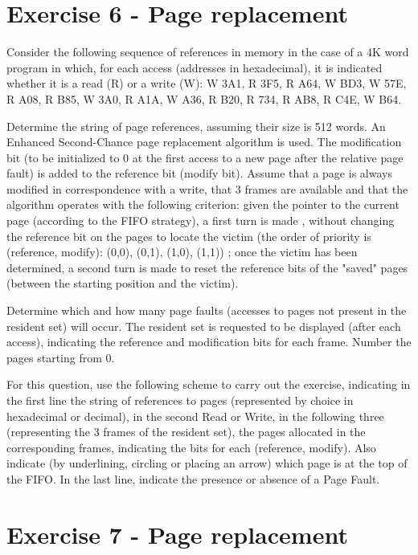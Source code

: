 \section{Exercise 6 - Page replacement}

Consider the following sequence of references in memory in the case of a 4K word program in which, for each access (addresses in hexadecimal), it is indicated whether it is a read (R) or a write (W): W 3A1, R 3F5, R A64, W BD3, W 57E, R A08, R B85, W 3A0, R A1A, W A36, R B20, R 734, R AB8, R C4E, W B64.

Determine the string of page references, assuming their size is 512 words. An Enhanced Second-Chance page replacement algorithm is used. The modification bit (to be initialized to 0 at the first access to a new page after the relative page fault) is added to the reference bit (modify bit). Assume that a page is always modified in correspondence with a write, that 3 frames are available and that the algorithm operates with the following criterion: given the pointer to the current page (according to the FIFO strategy), a first turn is made , without changing the reference bit on the pages to locate the victim (the order of priority is (reference, modify): (0,0), (0,1), (1,0), (1,1)) ; once the victim has been determined, a second turn is made to reset the reference bits of the "saved" pages (between the starting position and the victim).

Determine which and how many page faults (accesses to pages not present in the resident set) will occur. The resident set is requested to be displayed (after each access), indicating the reference and modification bits for each frame. Number the pages starting from 0.

For this question, use the following scheme to carry out the exercise, indicating in the first line the string of references to pages (represented by choice in hexadecimal or decimal), in the second Read or Write, in the following three (representing the 3 frames of the resident set), the pages allocated in the corresponding frames, indicating the bits for each (reference, modify). Also indicate (by underlining, circling or placing an arrow) which page is at the top of the FIFO.
In the last line, indicate the presence or absence of a Page Fault.


\section{Exercise 7 - Page replacement}


